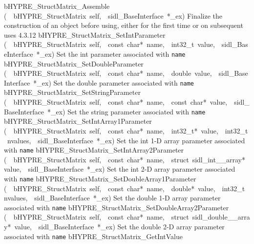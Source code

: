 \documentclass{article}
\begin{document}
\begin{cxxentry}
\begin{cxxentry}
\begin{cxxnames}
        {bHYPRE\_StructMatrix\_Assemble}
        {(\ \ bHYPRE\_StructMatrix\ self,\ \ sidl\_BaseInterface\ *\_ex)}
        {
Finalize the construction of an object before using, either
for the first time or on subsequent uses}
        {4.3.12}
        {bHYPRE\_StructMatrix\_SetIntParameter}
        {(\ \ bHYPRE\_StructMatrix\ self,\ \ const\ char*\ name,\ \ int32\_t\ value,\ \ sidl\_BaseInterface\ *\_ex)}
        {
Set the int parameter associated with {\tt name}}
        {}
\label{cxx.4.3.20}
        {bHYPRE\_StructMatrix\_SetDoubleParameter}
        {(\ \ bHYPRE\_StructMatrix\ self,\ \ const\ char*\ name,\ \ double\ value,\ \ sidl\_BaseInterface\ *\_ex)}
        {
Set the double parameter associated with {\tt name}}
        {}
\label{cxx.4.3.21}
        {bHYPRE\_StructMatrix\_SetStringParameter}
        {(\ \ bHYPRE\_StructMatrix\ self,\ \ const\ char*\ name,\ \ const\ char*\ value,\ \ sidl\_BaseInterface\ *\_ex)}
        {
Set the string parameter associated with {\tt name}}
        {}
\label{cxx.4.3.22}
        {bHYPRE\_StructMatrix\_SetIntArray1Parameter}
        {(\ \ bHYPRE\_StructMatrix\ self,\ \ const\ char*\ name,\ \ int32\_t*\ value,\ \ int32\_t\ nvalues,\ \ sidl\_BaseInterface\ *\_ex)}
        {
Set the int 1-D array parameter associated with {\tt name}}
        {}
\label{cxx.4.3.23}
        {bHYPRE\_StructMatrix\_SetIntArray2Parameter}
        {(\ \ bHYPRE\_StructMatrix\ self,\ \ const\ char*\ name,\ \ struct\ sidl\_int\_\_array*\ value,\ \ sidl\_BaseInterface\ *\_ex)}
        {
Set the int 2-D array parameter associated with {\tt name}}
        {}
\label{cxx.4.3.24}
        {bHYPRE\_StructMatrix\_SetDoubleArray1Parameter}
        {(\ \ bHYPRE\_StructMatrix\ self,\ \ const\ char*\ name,\ \ double*\ value,\ \ int32\_t\ nvalues,\ \ sidl\_BaseInterface\ *\_ex)}
        {
Set the double 1-D array parameter associated with {\tt name}}
        {}
\label{cxx.4.3.25}
        {bHYPRE\_StructMatrix\_SetDoubleArray2Parameter}
        {(\ \ bHYPRE\_StructMatrix\ self,\ \ const\ char*\ name,\ \ struct\ sidl\_double\_\_array*\ value,\ \ sidl\_BaseInterface\ *\_ex)}
        {
Set the double 2-D array parameter associated with {\tt name}}
        {}
\label{cxx.4.3.26}
        {bHYPRE\_StructMatrix\_GetIntValue}

\end{cxxnames}
\end{cxxentry}
\end{cxxentry}
\end{document}
